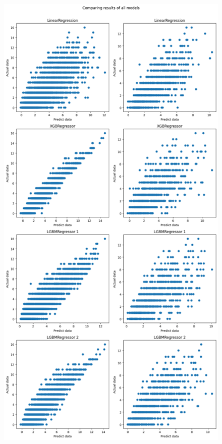\documentclass{article}
\begin{document}
\begin{figure}[H]
  \centering
  \begin{minipage}[b]{0.5\textwidth}
    \centering
    \includegraphics[width=\textwidth]{all_models_3.png}

\end{minipage}
\end{figure}
\end{document}
